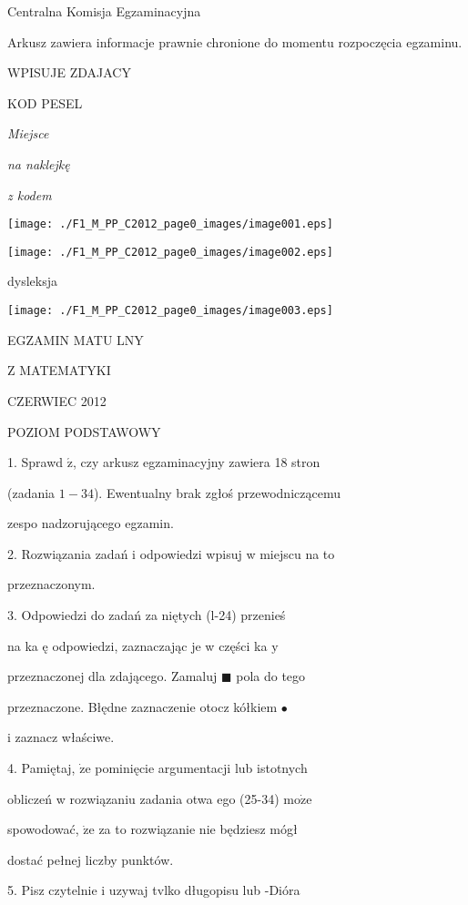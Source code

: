 \documentclass[a4paper,12pt]{article}
\begin{document}
Centralna Komisja Egzaminacyjna

Arkusz zawiera informacje prawnie chronione do momentu rozpoczęcia egzaminu.

WPISUJE ZDAJACY

KOD PESEL

{\it Miejsce}

{\it na naklejkę}

{\it z kodem}
\begin{center}
\texttt{[image: ./F1\_M\_PP\_C2012\_page0\_images/image001.eps]}

\texttt{[image: ./F1\_M\_PP\_C2012\_page0\_images/image002.eps]}
\end{center}
\fbox{} dysleksja
\begin{center}
\texttt{[image: ./F1\_M\_PP\_C2012\_page0\_images/image003.eps]}
\end{center}
EGZAMIN MATU LNY

Z MATEMATYKI

CZERWIEC 2012

POZIOM PODSTAWOWY

1. Sprawd $\acute{\mathrm{z}}$, czy arkusz egzaminacyjny zawiera 18 stron

(zadania $1-34$). Ewentualny brak zgłoś przewodniczącemu

zespo nadzorującego egzamin.

2. Rozwiązania zadań i odpowiedzi wpisuj w miejscu na to

przeznaczonym.

3. Odpowiedzi do zadań za niętych (l-24) przenieś

na ka ę odpowiedzi, zaznaczając je w części ka $\mathrm{y}$

przeznaczonej dla zdającego. Zamaluj $\blacksquare$ pola do tego

przeznaczone. Błędne zaznaczenie otocz kółkiem \fcircle$\bullet$

i zaznacz właściwe.

4. Pamiętaj, $\dot{\mathrm{z}}\mathrm{e}$ pominięcie argumentacji lub istotnych

obliczeń w rozwiązaniu zadania otwa ego (25-34) $\mathrm{m}\mathrm{o}\dot{\mathrm{z}}\mathrm{e}$

spowodować, $\dot{\mathrm{z}}\mathrm{e}$ za to rozwiązanie nie będziesz mógł

dostać pełnej liczby punktów.

5. Pisz czytelnie i uzywaj tvlko długopisu lub -Dióra
\end{document}

